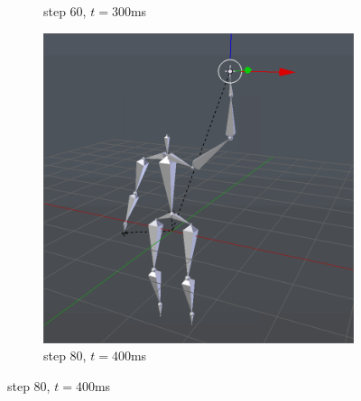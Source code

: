 \documentclass[10pt,twocolumn,letterpaper]{article}
\begin{document}
\begin{figure}[h]
\begin{subfigure}{0.2\textwidth}
        \caption{step 60, $t=300$ms}
    \end{subfigure}\begin{subfigure}{0.2\textwidth}
        \centering
        \includegraphics[width=.9\linewidth]{raise-circ-4.png}
        \caption{step 80, $t=400$ms}
    \end{subfigure}


\end{figure}
\end{document}
